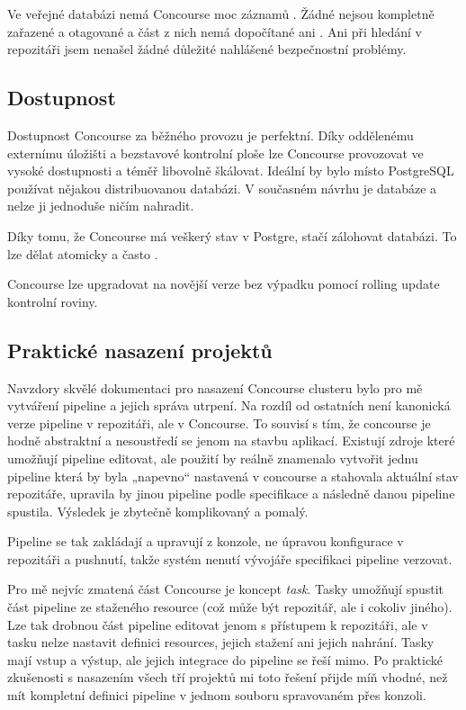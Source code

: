         Ve veřejné databázi  nemá Concourse moc záznamů \cite{cve-concourse}. Žádné nejsou kompletně zařazené a otagované a část z nich nemá dopočítané ani . Ani při hledání v repozitáři jsem nenašel žádné důležité nahlášené bezpečnostní problémy.

    \subsection{Dostupnost}
        Dostupnost Concourse za běžného provozu je perfektní. Díky oddělenému externímu úložišti a bezstavové kontrolní ploše lze Concourse provozovat ve vysoké dostupnosti a téměř libovolně škálovat. Ideální by bylo místo PostgreSQL používat nějakou distribuovanou  databázi. V současném návrhu je databáze  a nelze ji jednoduše ničím nahradit.

        Díky tomu, že Concourse má veškerý stav v Postgre, stačí zálohovat databázi. To lze dělat atomicky a často \cite{pg-backup}.

        Concourse lze upgradovat na novější verze bez výpadku pomocí rolling update kontrolní roviny.

    \subsection{Praktické nasazení projektů}
        Navzdory skvělé dokumentaci pro nasazení Concourse clusteru bylo pro mě vytváření pipeline a jejich správa utrpení. Na rozdíl od ostatních \CI není kanonická verze pipeline v repozitáři, ale v Concourse. To souvisí s tím, že concourse je hodně abstraktní a nesoustředí se jenom na stavbu aplikací. Existují zdroje \cite{concourse-pipeline-res} které umožňují pipeline editovat, ale použití by reálně znamenalo vytvořit jednu pipeline která by byla „napevno“ nastavená v concourse a stahovala aktuální stav repozitáře, upravila by jinou pipeline podle specifikace a následně danou pipeline spustila. Výsledek je zbytečně komplikovaný a pomalý.

        Pipeline se tak zakládají a upravují z konzole, ne úpravou konfigurace v repozitáři a pushnutí, takže systém nenutí vývojáře specifikaci pipeline verzovat.

        Pro mě nejvíc zmatená část Concourse je koncept \textit{task}. Tasky umožňují spustit část pipeline ze staženého resource (což může být repozitář, ale i cokoliv jiného). Lze tak drobnou část pipeline editovat jenom s přístupem k repozitáři, ale v tasku nelze nastavit definici resources, jejich stažení ani jejich nahrání. Tasky mají vstup a výstup, ale jejich integrace do pipeline se řeší mimo. Po praktické zkušenosti s nasazením všech tří projektů mi toto řešení přijde míň vhodné, než mít kompletní definici pipeline v jednom souboru spravovaném přes konzoli.

